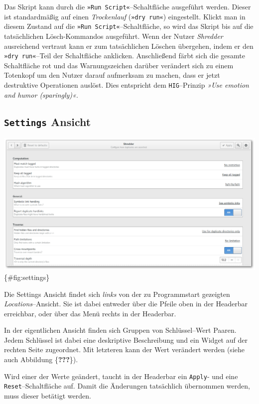 \documentclass[11pt,ngerman,toc=listof,index=totoc]{scrreprt}
\begin{document}
Das Skript kann durch die \texttt{»Run\ Script«}--Schaltfläche
ausgeführt werden. Dieser ist standardmäßig auf einen \emph{Trockenlauf}
(\texttt{»dry\ run«}) eingestellt. Klickt man in diesem Zustand auf die
\texttt{»Run\ Script«}--Schaltfläche, so wird das Skript bis auf die
tatsächlichen Lösch-Kommandos ausgeführt. Wenn der Nutzer
\emph{Shredder} ausreichend vertraut kann er zum tatsächlichen Löschen
übergehen, indem er den \texttt{»dry\ run«}--Teil der Schaltfläche
anklicken. Anschließend färbt sich die gesamte Schaltfläche rot und das
Warnungszeichen darüber verändert sich zu einem Totenkopf um den Nutzer
darauf aufmerksam zu machen, dass er jetzt destruktive Operationen
auslöst. Dies entspricht dem \texttt{HIG}--Prinzip \emph{»Use emotion
and humor (sparingly)«}.

\subsection{\texorpdfstring{\texttt{Settings}
Ansicht}{Settings Ansicht}}\label{settings-ansicht}

\includegraphics{docs/pics/gui_settings.png} \{\#fig:settings\}

Die Settings Ansicht findet sich \emph{links} von der zu Programmstart
gezeigten \emph{Locations}--Ansicht. Sie ist dabei entweder über die
Pfeile oben in der Headerbar erreichbar, oder über das Menü rechts in
der Headerbar.

In der eigentlichen Ansicht finden sich Gruppen von Schlüssel--Wert
Paaren. Jedem Schlüssel ist dabei eine deskriptive Beschreibung und ein
Widget auf der rechten Seite zugeordnet. Mit letzteren kann der Wert
verändert werden (siehe auch Abbildung \{\textbf{???}\}).

Wird einer der Werte geändert, taucht in der Headerbar ein
\texttt{Apply}- und eine \texttt{Reset}--Schaltfläche auf. Damit die
Änderungen tatsächlich übernommen werden, muss dieser betätigt werden.
\end{document}
